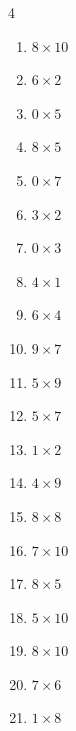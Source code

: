 \begin{multicols}{4}
\begin{enumerate}
  \item $8\times 10$
        \phantom{$=80$}

  \item $6\times 2$
        \phantom{$=12$}

  \item $0\times 5$
        \phantom{$=0$}

  \item $8\times 5$
        \phantom{$=40$}

  \item $0\times 7$
        \phantom{$=0$}

  \item $3\times 2$
        \phantom{$=6$}

  \item $0\times 3$
        \phantom{$=0$}

  \item $4\times 1$
        \phantom{$=4$}

  \item $6\times 4$
        \phantom{$=24$}

  \item $9\times 7$
        \phantom{$=63$}

  \item $5\times 9$
        \phantom{$=45$}

  \item $5\times 7$
        \phantom{$=35$}

  \item $1\times 2$
        \phantom{$=2$}

  \item $4\times 9$
        \phantom{$=36$}

  \item $8\times 8$
        \phantom{$=64$}

  \item $7\times 10$
        \phantom{$=70$}

  \item $8\times 5$
        \phantom{$=40$}

  \item $5\times 10$
        \phantom{$=50$}

  \item $8\times 10$
        \phantom{$=80$}

  \item $7\times 6$
        \phantom{$=42$}

\columnbreak %

  \item $1\times 8$
        \phantom{$=8$}


\end{enumerate}
\end{multicols}
